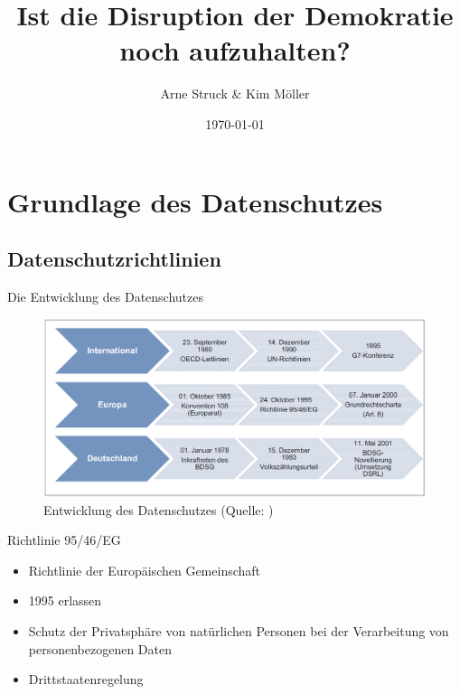 \documentclass{beamer}
\title{Ist die Disruption der Demokratie noch aufzuhalten?}
\subtitle{}
\author{Arne Struck \& Kim Möller}
\institute{Universität Hamburg, Fachschaft Informatik, Des Googles Kern}
\date{\today}
\begin{document}
\begin{frame}
\maketitle
\end{frame}

\begin{frame}{}
\tableofcontents
\end{frame}

\section{Grundlage des Datenschutzes}
\subsection{Datenschutzrichtlinien}
\begin{frame}{Die Entwicklung des Datenschutzes}
\begin{figure}[h]
\begin{center}
	\includegraphics[scale=0.28]{pics/datenschutz.png}
\end{center}
\caption{Entwicklung des Datenschutzes (Quelle: \cite{europData})}
\label{pic:datenschutz}
\end{figure}
\end{frame}

\begin{frame}{Richtlinie 95/46/EG}
\begin{itemize}
	\item Richtlinie der Europäischen Gemeinschaft
	\item 1995 erlassen
	\item Schutz der Privatsphäre von natürlichen Personen bei der Verarbeitung von personenbezogenen Daten
	\item Drittstaatenregelung
\end{itemize}
\end{frame}
\end{document}
